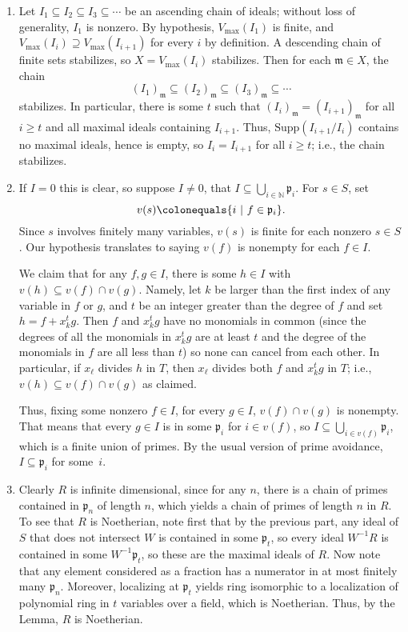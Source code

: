 \documentclass[12pt]{amsart}
\newcommand{\N}{\mathbb{N}}
\newcommand{\m}{\mathfrak{m}}
\newcommand{\p}{\mathfrak{p}}
\renewcommand{\1}{\mathbbm{1}}
\newcommand\ceq{\colonequals}
\begin{document}
\begin{enumerate}
{  \begin{enumerate}
\item Let $I_1\subseteq I_2 \subseteq I_3 \subseteq \cdots$ be an ascending chain of ideals; without loss of generality, $I_1$ is nonzero. By hypothesis, $V_{\max}(I_1)$ is finite, and $V_{\max}(I_i) \supseteq V_{\max}(I_{i+1})$ for every $i$ by definition. A descending chain of finite sets stabilizes, so $X=V_{\max}(I_i)$ stabilizes.  Then for each $\m\in X$, the chain 
\[(I_1)_{\m} \subseteq (I_2)_{\m} \subseteq (I_3)_{\m} \subseteq \cdots\]
stabilizes. In particular, there is some $t$ such that $(I_i)_{\m} = (I_{i+1})_{\m}$ for all $i\geq t$ and all maximal ideals containing $I_{i+1}$. Thus, $\mathrm{Supp}(I_{i+1}/I_i)$ contains no maximal ideals, hence is empty, so $I_i=I_{i+1}$ for all $i\geq t$; i.e., the chain stabilizes.
\item  If $I=0$ this is clear, so suppose $I\neq 0$, that $I\subseteq \bigcup_{i\in \N} \p_i$.
For $s\in S$, set 
\[ v(s)\ceq \{i \ | \ f\in \p_i\}.\]
Since $s$ involves finitely many variables, $v(s)$ is finite for each nonzero $s\in S$. Our hypothesis translates to saying $v(f)$ is nonempty for each $f\in I$.

We claim that for any $f,g\in I$, there is some $h\in I$ with $v(h) \subseteq v(f) \cap v(g)$. Namely, let $k$ be larger than the first index of any variable in $f$ or $g$, and $t$ be an integer greater than the degree of $f$ and set $h=f+x_k^t g$. Then $f$ and $x_k^t g$ have no monomials in common (since the degrees of all the monomials in $x_k^t g$ are at least $t$ and the degree of the monomials in $f$ are all less than $t$) so none can cancel from each other. In particular, if $x_\ell$ divides $h$ in $T$, then $x_\ell$  divides both $f$ and $x_k^t g$ in $T$; i.e., $v(h) \subseteq v(f) \cap v(g)$ as claimed.

Thus, fixing some nonzero $f\in I$, for every $g\in I$, $v(f) \cap v(g)$ is nonempty. That means that every $g\in I$ is in some $\p_i$ for $i  \in v(f)$, so $I \subseteq \bigcup_{i\in v(f)} \p_i$, which is a finite union of primes. By the usual version of prime avoidance, $I \subseteq \p_i$ for some~$i$.
\item Clearly $R$ is infinite dimensional, since for any $n$, there is a chain of primes contained in $\p_n$ of length $n$, which yields a chain of primes of length $n$ in $R$. To see that $R$ is Noetherian, note first that by the previous part, any ideal of $S$ that does not intersect $W$ is contained in some $\p_t$, so every ideal $W^{-1} R$ is contained in some $W^{-1}\p_t$, so these are the maximal ideals of $R$. Now note that any element considered as a fraction has a numerator in at most finitely many $\p_n$. Moreover, localizing at $\p_t$ yields ring isomorphic to a localization of polynomial ring in $t$ variables over a field, which is Noetherian. Thus, by the Lemma, $R$ is Noetherian.
 \end{enumerate}
 }
  
  



\end{enumerate}
\end{document}
